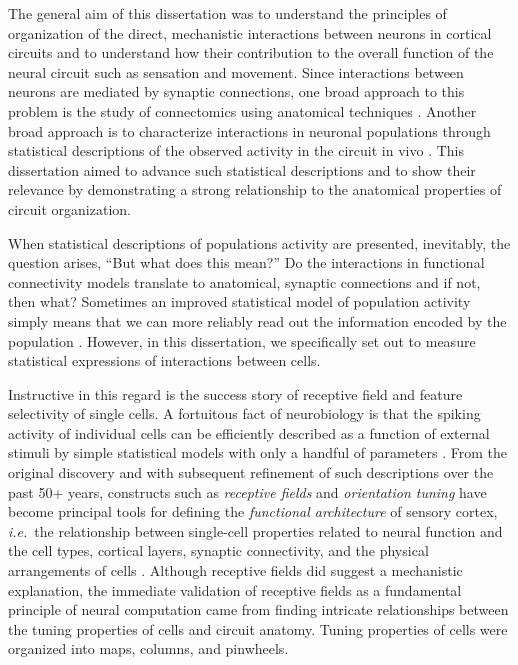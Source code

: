 The general aim of this dissertation was to understand the principles of organization of the direct, mechanistic interactions between neurons in cortical circuits and to understand how their contribution to the overall function of the neural circuit such as sensation and movement. Since interactions between neurons are mediated by synaptic connections, one broad approach to this problem is the study of connectomics using anatomical techniques \citep{Denk:2004,Perin:2011,Jiang:2013}. Another broad approach is to characterize interactions in neuronal populations through statistical descriptions of the observed activity in the circuit in vivo \citep{Perkel:1967,Zohary:1994,Bair:2001,Smith:2008,Ecker:2010}. This dissertation aimed to advance such statistical descriptions and to show their relevance by demonstrating a strong relationship to the anatomical properties of circuit organization.

When statistical descriptions of populations activity are presented, inevitably, the question arises, ``But what does this mean?'' 
Do the interactions in functional connectivity models translate to anatomical, synaptic connections and if not, then what?  Sometimes an improved statistical model of population activity simply means that we can more reliably read out  the information encoded by the population \citep{Pillow:2011}. However, in this dissertation, we specifically set out to measure statistical expressions of interactions between cells. 
 
Instructive in this regard is the success story of receptive field and feature selectivity of single cells. 
A fortuitous fact of neurobiology is that the spiking activity of individual cells can be efficiently described as a function of external stimuli by simple statistical models with only a handful of parameters \citep{Carandini:2005}. From the original discovery and with subsequent refinement of such descriptions over the past 50+ years, constructs such as \emph{receptive fields} and \emph{orientation tuning} have become principal tools for defining the \emph{functional architecture} of sensory cortex, \emph{i.e.}\ the relationship between single-cell properties related to neural function and the cell types, cortical layers, synaptic connectivity, and the physical arrangements of cells  \citep{Hubel:1962,Ohki:2005,Reid:2012}. Although receptive fields did suggest a mechanistic explanation, the immediate validation of receptive fields as a fundamental principle of neural computation came from finding intricate relationships between the tuning properties of cells and circuit anatomy. Tuning properties of cells were organized into maps, columns, and pinwheels. 

